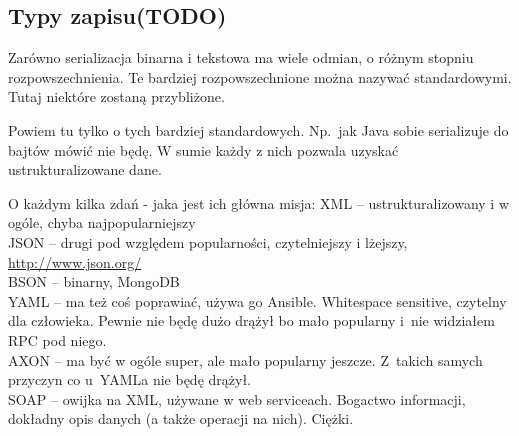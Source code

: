 



\subsection{Typy zapisu(TODO)}
Zarówno serializacja binarna i tekstowa ma wiele odmian, o różnym stopniu rozpowszechnienia. Te bardziej rozpowszechnione można nazywać standardowymi. Tutaj niektóre zostaną przybliżone.

Powiem tu tylko o tych bardziej standardowych. Np.\ jak Java sobie serializuje do bajtów mówić nie będę.
W sumie każdy z nich pozwala uzyskać ustrukturalizowane dane.

O każdym kilka zdań - jaka jest ich główna misja:
XML -- ustrukturalizowany i w ogóle, chyba najpopularniejszy\\
JSON -- drugi pod względem popularności, czytelniejszy i lżejszy, \url{http://www.json.org/}\\
BSON -- binarny, MongoDB\\
YAML -- ma też coś poprawiać, używa go Ansible. Whitespace sensitive, czytelny dla człowieka. Pewnie nie będę dużo drążył bo mało popularny i~nie widziałem RPC pod niego.\\
AXON -- ma być w ogóle super, ale mało popularny jeszcze. Z~takich samych przyczyn co u~YAMLa nie będę drążył.\\
SOAP -- owijka na XML, używane w web serviceach. Bogactwo informacji, dokładny opis danych (a także operacji na nich). Ciężki.\\

